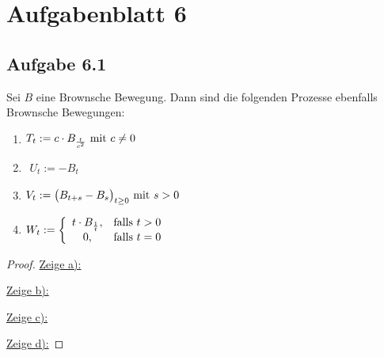 
\section{Aufgabenblatt 6}
\subsection{Aufgabe 6.1}
Sei $B$ eine Brownsche Bewegung.
Dann sind die folgenden Prozesse ebenfalls Brownsche Bewegungen:
\begin{enumerate}[label=\alph*)]
	\item $\begin{aligned}
		T_t:=c\cdot B_{\frac{t}{c^2}}\mit c\neq0
	\end{aligned}$
	\item $\begin{aligned}
		U_t:=-B_t
	\end{aligned}$
	\item $\begin{aligned}
		V_t:=\big(B_{t+s}-B_s\big)_{t\geq0}\mit s>0
	\end{aligned}$
	\item $\begin{aligned}
		W_t:=\left\lbrace\begin{array}{cl}
			t\cdot B_{\frac{1}{t}} ,&\falls t>0\\
			0, &\falls t=0
		\end{array}\right.
	\end{aligned}$
\end{enumerate}

\begin{proof}
	\underline{Zeige a):}

	\underline{Zeige b):}

	\underline{Zeige c):}

	\underline{Zeige d):}

\end{proof}

